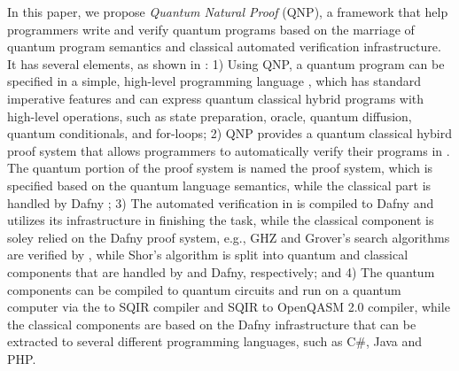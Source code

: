 In this paper, we propose \emph{Quantum Natural Proof} (QNP), a framework that help programmers write and verify quantum programs based on the marriage of quantum program semantics and classical automated verification infrastructure. It has several elements, as shown in :
1) Using QNP, a quantum program can be specified in a simple, high-level programming
language \qafny, which has standard imperative features and
can express quantum classical hybrid programs with high-level operations,
such as state preparation, oracle, quantum diffusion, quantum conditionals, and for-loops;
2) QNP provides a quantum classical hybird proof system that allows programmers to automatically verify their programs in \qafny.
The quantum portion of the proof system is named the \qafny proof system,
which is specified based on the \qafny quantum language semantics, while the classical part is handled by Dafny \cite{dafnyref};
3) The automated verification in \qafny is compiled to Dafny and utilizes its infrastructure in finishing the task, while the classical component is soley relied on the Dafny proof system, e.g., GHZ and Grover's search algorithms are verified by \qafny, while Shor's algorithm is split into quantum and classical components that are handled by \qafny and Dafny, respectively;
and 4) The \qafny quantum components can be compiled to quantum circuits and run on a quantum computer via the \qafny to SQIR compiler and SQIR to OpenQASM 2.0 \cite{Cross2017} compiler, while the classical components are based on the Dafny infrastructure that can be extracted to several different programming languages, such as C\#, Java and PHP.

